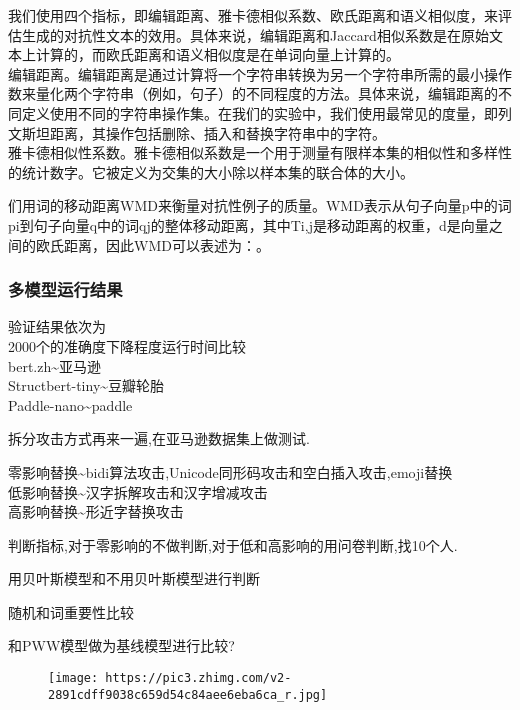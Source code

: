 \documentclass[
]{article}
\begin{document}
我们使用四个指标，即编辑距离、雅卡德相似系数、欧氏距离和语义相似度，来评估生成的对抗性文本的效用。具体来说，编辑距离和Jaccard相似系数是在原始文本上计算的，而欧氏距离和语义相似度是在单词向量上计算的。\\
编辑距离。编辑距离是通过计算将一个字符串转换为另一个字符串所需的最小操作数来量化两个字符串（例如，句子）的不同程度的方法。具体来说，编辑距离的不同定义使用不同的字符串操作集。在我们的实验中，我们使用最常见的度量，即列文斯坦距离，其操作包括删除、插入和替换字符串中的字符。\\
雅卡德相似性系数。雅卡德相似系数是一个用于测量有限样本集的相似性和多样性的统计数字。它被定义为交集的大小除以样本集的联合体的大小。

们用词的移动距离WMD来衡量对抗性例子的质量。WMD表示从句子向量p中的词pi到句子向量q中的词qj的整体移动距离，其中Ti,j是移动距离的权重，d是向量之间的欧氏距离，因此WMD可以表述为：。

\hypertarget{ux591aux6a21ux578bux8fd0ux884cux7ed3ux679c}{%
\subsubsection{多模型运行结果}\label{ux591aux6a21ux578bux8fd0ux884cux7ed3ux679c}}

验证结果依次为\\
2000个的准确度下降程度运行时间比较\\
bert.zh\textasciitilde 亚马逊\\
Structbert-tiny\textasciitilde 豆瓣轮胎\\
Paddle-nano\textasciitilde paddle

拆分攻击方式再来一遍,在亚马逊数据集上做测试.

零影响替换\textasciitilde bidi算法攻击,Unicode同形码攻击和空白插入攻击,emoji替换\\
低影响替换\textasciitilde 汉字拆解攻击和汉字增减攻击\\
高影响替换\textasciitilde 形近字替换攻击

判断指标,对于零影响的不做判断,对于低和高影响的用问卷判断,找10个人.

用贝叶斯模型和不用贝叶斯模型进行判断

随机和词重要性比较

和PWW模型做为基线模型进行比较?

\begin{figure}
\centering
\texttt{[image: https://pic3.zhimg.com/v2-2891cdff9038c659d54c84aee6eba6ca\_r.jpg]}
\caption{}
\end{figure}
\end{document}
